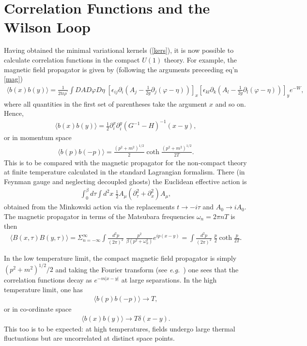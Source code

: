 \documentclass[a4paper,a4paper]{article}
\begin{document}
%
\section{Correlation Functions and the Wilson Loop} \label{sec:corrs}
Having obtained the minimal variational kernels (\ref{kers}), it is now possible to calculate correlation functions in
the compact $U(1)$ theory. For example, the magnetic field propagator is given by (following the arguments preceeding
eq'n \ref{mag})
\begin{gather}
\langle b(x) b(y) \rangle =
\frac {1}{2\mathrm{tr} \rho^{'}} \int DA D \varphi D \eta \;
\left[ \epsilon_{ij} \partial_i \left(A_j - \frac{1}{2g} \partial_j (\varphi - \eta)\right) \right]_x
\left[ \epsilon_{kl} \partial_k \left(A_l - \frac{1}{2g} \partial_l (\varphi - \eta)\right) \right]_y
e^{-W},
\end{gather}
where all quantities in the first set of parentheses take the argument $x$ and so on. Hence,
\begin{gather}
\langle b(x) b(y) \rangle = \frac{1}{2} \partial_{i}^{x} \partial_{i}^{y} (G^{-1} - H )^{-1} (x-y),
\end{gather}
or in momentum space
\begin{gather}
\langle b(p) b(-p) \rangle = \frac{ (p^2 + m^2)^{1/2}}{2} \coth \frac{(p^2 + m^2)^{1/2}}{2T}.
\end{gather}
This is to be compared with the magnetic propagator for the non-compact theory 
at finite temperature calculated in the standard Lagrangian formalism.
There (in Feynman gauge and neglecting decoupled ghosts) the Euclidean effective action is
\cite{Kapusta:1989tk}
\begin{gather}
\int_{0}^{\beta} d \tau \int d^2x \; \frac{1}{2} A_{\mu} \left( \partial^{2}_{\tau} + \partial^{2}_{x}\right) A_{\mu},
\end{gather}
obtained from the Minkowski action via the replacements $t \rightarrow -i\tau$ and $A_0 \rightarrow i A_0$.
The magnetic propagator in terms of the Matsubara frequencies $\omega_n = 2 \pi n T$ is then
\begin{gather} \label{lag}
\langle B(x,\tau) B(y, \tau) \rangle = 
\Sigma_{n=-\infty}^{\infty} \int \frac{d^2 p}{(2 \pi)^2} \; \frac{p^2}{\beta (p^2 + \omega_{n}^{2})} e^{ip(x-y)}
= \int \frac{d^2 p}{(2 \pi)^2} \; \frac{ p}{2} \coth \frac{ p}{2T}.
\end{gather}

In the low temperature limit, the compact magnetic field propagator is simply $(p^2 + m^2)^{1/2}/2$ and taking the Fourier transform
(see \emph{e.g.\ }\cite{Gripaios:2002bu}) one sees that the correlation functions decay as $e^{-m|x-y|}$ at large separations.
In the high temperature limit, one has
\begin{gather}
\langle b(p) b(-p) \rangle \rightarrow T,
\end{gather}
or in co-ordinate space
\begin{gather}
\langle b(x) b(y) \rangle \rightarrow T \delta (x-y).
\end{gather}
This too is to be expected: at high temperatures, 
fields undergo large thermal fluctuations but are uncorrelated at distinct space points.
\end{document}
